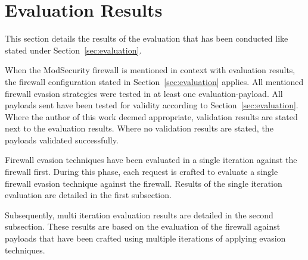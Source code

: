 \section{Evaluation Results}
\label{sec:EvaluationResults}
This section details the results of the evaluation that has been conducted like stated under Section~\ref{sec:evaluation}. 

When the ModSecurity firewall is mentioned in context with evaluation results, the firewall configuration stated in Section~\ref{sec:evaluation} applies. 
All mentioned firewall evasion strategies were tested in at least one evaluation-payload.
All payloads sent have been tested for validity according to Section~\ref{sec:evaluation}.
Where the author of this work deemed appropriate, validation results are stated next to the evaluation results. Where no validation results are stated, the payloads validated successfully.

Firewall evasion techniques have been evaluated in a single iteration against the firewall first. During this phase, each request is crafted to evaluate a single firewall evasion technique against the firewall. Results of the single iteration evaluation are detailed in the first subsection. 

Subsequently, multi iteration evaluation results are detailed in the second subsection. These results are based on the evaluation of the firewall against payloads that have been crafted using multiple iterations of applying evasion techniques.

%
